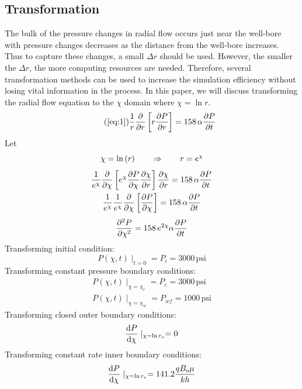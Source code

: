 \documentclass[12pt,letterpaper,titlepage]{article}
\begin{document}
\subsection{Transformation}
The bulk of the pressure changes in radial flow occurs just near the well-bore with pressure changes decreases as the distance from the well-bore increases. Thus to capture these changes, a small $\Delta r$ should be used. However, the smaller the $\Delta r$, the more computing resources are needed. Therefore, several transformation methods can be used to increase the simulation efficiency without losing vital information in the process. In this paper, we will discuss transforming the radial flow equation to the $\chi$ domain where $\chi=\ln{r}$.
\begin{equation*}
\tag{\ref{eq:1}}
\frac{1}{r}\pdv{}{r}\left[r\pdv{P}{r}\right] = 158\, \alpha \pdv{P}{t}
\end{equation*}
Let $$\chi=\ln{(r)}\qquad \Rightarrow \qquad r=e^{\chi}\\$$
\begin{gather*}
\frac{1}{e^{\chi}}\pdv{}{\chi}\left[e^{\chi}\pdv{P}{\chi}\pdv{\chi}{r}\right] \pdv{\chi}{r}= 158\, \alpha \pdv{P}{t} \\
\frac{1}{e^{\chi}}\frac{1}{e^{\chi}}\pdv{}{\chi}\left[\pdv{P}{\chi}\right] =158\,  \alpha \pdv{P}{t}\\
\end{gather*}
\begin{equation}\label{eq:2}
\pdv[2]{P}{\chi} = 158\, e^{2\chi}\alpha \pdv{P}{t} 
\end{equation} 
Transforming initial condition:
\begin{equation}
P(\chi,t)\mid_{t=0}=P_i=3000\,\text{psi}
\end{equation}
Transforming constant pressure boundary conditions:
\begin{gather}
P(\chi,t)\mid_{\chi=\chi_e}=P_e=3000\,\text{psi}\\
P(\chi,t)\mid_{\chi=\chi_w}=P_{wf}=1000\,\text{psi}
\end{gather}
Transforming closed outer boundary conditions:
\begin{equation}
\dv{P}{\chi}\mid_{\chi=\ln{r_e}}=0\\
\end{equation}
Transforming constant rate inner boundary conditions:
\begin{equation}
\dv{P}{\chi}\mid_{\chi=\ln{r_e}}=141.2\frac{qB_o\mu}{kh}\\
\end{equation}
\end{document}

